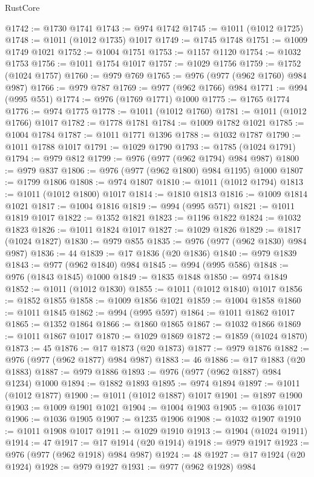 \begin{lexlean}{RustCore}
\begin{coremodule}
@1742 := @1730 @1741
@1743 := @974 @1742
@1745 := @1011 (@1012 @1725)
@1748 := @1011 (@1012 @1735) @1017
@1749 := @1745 @1748
@1751 := @1009 @1749 @1021
@1752 := @1004 @1751
@1753 := @1157 @1120
@1754 := @1032 @1753
@1756 := @1011 @1754 @1017
@1757 := @1029 @1756
@1759 := @1752 (@1024 @1757)
@1760 := @979 @769
@1765 := @976 (@977 (@962 @1760) @984 @987)
@1766 := @979 @787
@1769 := @977 (@962 @1766) @984
@1771 := @994 (@995 @551)
@1774 := @976 (@1769 @1771) @1000
@1775 := @1765 @1774
@1776 := @974 @1775
@1778 := @1011 (@1012 @1760)
@1781 := @1011 (@1012 @1766) @1017
@1782 := @1778 @1781
@1784 := @1009 @1782 @1021
@1785 := @1004 @1784
@1787 := @1011 @1771 @1396
@1788 := @1032 @1787
@1790 := @1011 @1788 @1017
@1791 := @1029 @1790
@1793 := @1785 (@1024 @1791)
@1794 := @979 @812
@1799 := @976 (@977 (@962 @1794) @984 @987)
@1800 := @979 @837
@1806 := @976 (@977 (@962 @1800) @984 @1195) @1000
@1807 := @1799 @1806
@1808 := @974 @1807
@1810 := @1011 (@1012 @1794)
@1813 := @1011 (@1012 @1800) @1017
@1814 := @1810 @1813
@1816 := @1009 @1814 @1021
@1817 := @1004 @1816
@1819 := @994 (@995 @571)
@1821 := @1011 @1819 @1017
@1822 := @1352 @1821
@1823 := @1196 @1822
@1824 := @1032 @1823
@1826 := @1011 @1824 @1017
@1827 := @1029 @1826
@1829 := @1817 (@1024 @1827)
@1830 := @979 @855
@1835 := @976 (@977 (@962 @1830) @984 @987)
@1836 := 44
@1839 := @17 @1836 (@20 @1836)
@1840 := @979 @1839
@1843 := @977 (@962 @1840) @984
@1845 := @994 (@995 @586)
@1848 := @976 (@1843 @1845) @1000
@1849 := @1835 @1848
@1850 := @974 @1849
@1852 := @1011 (@1012 @1830)
@1855 := @1011 (@1012 @1840) @1017
@1856 := @1852 @1855
@1858 := @1009 @1856 @1021
@1859 := @1004 @1858
@1860 := @1011 @1845
@1862 := @994 (@995 @597)
@1864 := @1011 @1862 @1017
@1865 := @1352 @1864
@1866 := @1860 @1865
@1867 := @1032 @1866
@1869 := @1011 @1867 @1017
@1870 := @1029 @1869
@1872 := @1859 (@1024 @1870)
@1873 := 45
@1876 := @17 @1873 (@20 @1873)
@1877 := @979 @1876
@1882 := @976 (@977 (@962 @1877) @984 @987)
@1883 := 46
@1886 := @17 @1883 (@20 @1883)
@1887 := @979 @1886
@1893 := @976 (@977 (@962 @1887) @984 @1234) @1000
@1894 := @1882 @1893
@1895 := @974 @1894
@1897 := @1011 (@1012 @1877)
@1900 := @1011 (@1012 @1887) @1017
@1901 := @1897 @1900
@1903 := @1009 @1901 @1021
@1904 := @1004 @1903
@1905 := @1036 @1017
@1906 := @1036 @1905
@1907 := @1235 @1906
@1908 := @1032 @1907
@1910 := @1011 @1908 @1017
@1911 := @1029 @1910
@1913 := @1904 (@1024 @1911)
@1914 := 47
@1917 := @17 @1914 (@20 @1914)
@1918 := @979 @1917
@1923 := @976 (@977 (@962 @1918) @984 @987)
@1924 := 48
@1927 := @17 @1924 (@20 @1924)
@1928 := @979 @1927
@1931 := @977 (@962 @1928) @984

\end{coremodule}
\end{lexlean}
